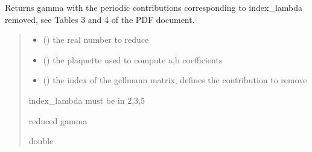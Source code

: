 \documentclass[letterpaper,10pt,english]{sphinxmanual}
\begin{document}
\begin{fulllineitems}
\label{\detokenize{analytical_reject:analytical_reject.reduce}}
\pysigstartsignatures
\pysiglinewithargsret
{}
{\sphinxparamcomma {}\sphinxparamcomma {}}
{}
\pysigstopsignatures
\sphinxAtStartPar
Returns gamma with the periodic contributions corresponding to index\_lambda removed, see Tables 3 and 4 of the PDF document.
\begin{quote}\begin{description}
\begin{itemize}
\item {} 
\sphinxAtStartPar
{} () \textendash{} the real number to reduce

\item {} 
\sphinxAtStartPar
{} () \textendash{} the plaquette used to compute a,b coefficients

\item {} 
\sphinxAtStartPar
{} () \textendash{} the index of the gell\sphinxhyphen{}mann matrix, defines the contribution to remove

\end{itemize}

\sphinxAtStartPar
{} \textendash{} index\_lambda must be in 2,3,5

\sphinxAtStartPar
reduced gamma

\sphinxAtStartPar
double

\end{description}\end{quote}

\end{fulllineitems}

\end{document}

